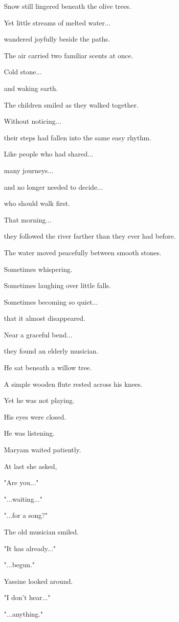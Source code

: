 \documentclass[12pt,openany]{book}
\begin{document}
Snow still lingered beneath the olive trees.

Yet little streams of melted water...

wandered joyfully beside the paths.

The air carried two familiar scents at once.

Cold stone...

and waking earth.

The children smiled as they walked together.

Without noticing...

their steps had fallen into the same easy rhythm.

Like people who had shared...

many journeys...

and no longer needed to decide...

who should walk first.

That morning...

they followed the river farther than they ever had before.

The water moved peacefully between smooth stones.

Sometimes whispering.

Sometimes laughing over little falls.

Sometimes becoming so quiet...

that it almost disappeared.

Near a graceful bend...

they found an elderly musician.

He sat beneath a willow tree.

A simple wooden flute rested across his knees.

Yet he was not playing.

His eyes were closed.

He was listening.

Maryam waited patiently.

At last she asked,

"Are you..."

"...waiting..."

"...for a song?"

The old musician smiled.

"It has already..."

"...begun."

Yassine looked around.

"I don't hear..."

"...anything."
\end{document}
